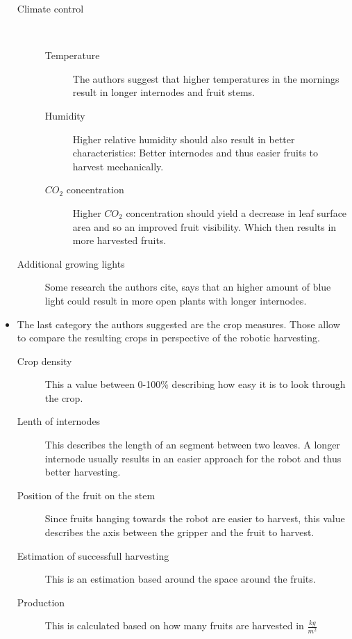 \begin{itemize}
\begin{description}
            \item[Climate control] \
            \begin{description}
                \item[Temperature] The authors suggest that higher temperatures in the mornings result in longer internodes and fruit stems.
                \item[Humidity] Higher relative humidity should also result in better characteristics: Better internodes and thus easier fruits to harvest mechanically.
                \item[$CO_2$ concentration] Higher $CO_2$ concentration should yield a decrease in leaf surface area and so an improved fruit visibility. Which then results in more harvested fruits. 
            \end{description}
            \item[Additional growing lights] Some research the authors cite, says that an higher amount of blue  light could result in more open plants with longer internodes.
        \end{description}
        \item The last category the authors suggested are the crop measures. Those allow to compare the resulting crops in perspective of the robotic harvesting. \
        \begin{description}
            \item[Crop density] This a value between 0-100\% describing how easy it is to look through the crop.  
            \item[Lenth of internodes] This describes the length of an segment between two leaves. A longer internode usually results in an easier approach for
             the robot and thus better harvesting. 
            \item[Position of the fruit on the stem] Since fruits hanging towards the robot are easier to harvest, this value describes the axis between the
             gripper and the fruit to harvest.
            \item[Estimation of successfull harvesting] This is an estimation based around the space around the fruits. 
            \item[Production] This is calculated based on how many fruits are harvested in $\frac{kg}{m^2}$   
        \end{description}
    \end{itemize}
